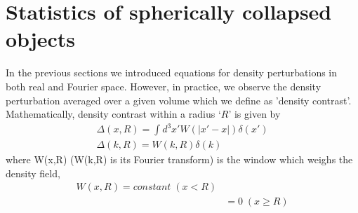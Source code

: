 \section{Statistics of spherically collapsed objects}
\label{stats}
In the previous sections we introduced equations for density perturbations in both real and Fourier space. However, in practice, we observe the density perturbation averaged over a given volume which we define as 'density contrast'. Mathematically, density contrast within a radius `$R$' is given by
\begin{eqnarray}
\Delta(x, R) = \int d^{3}x' W(|x' - x|) \delta(x') \\
\Delta(k, R) = W(k,R) \delta(k)
\end{eqnarray}
where W(x,R) (W(k,R) is its Fourier transform) is the window which weighs the density field, 
\begin{align}
W(x, R) = constant \; (x <R)\\
&= 0 \; (x \ge R)
\end{align}

